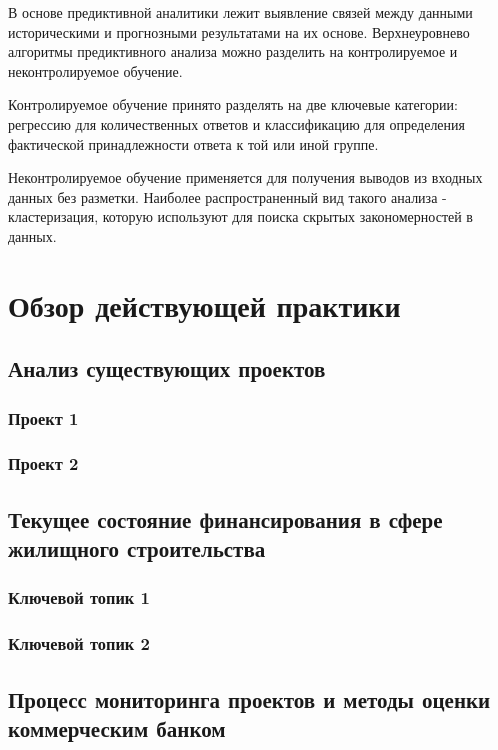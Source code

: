 \documentclass[12pt,a4paper]{article} %
\begin{document}
В основе предиктивной аналитики лежит выявление связей между данными историческими и прогнозными результатами на их основе. Верхнеуровнево алгоритмы предиктивного анализа можно разделить на контролируемое и неконтролируемое обучение.

Контролируемое обучение принято разделять на две ключевые категории: регрессию для количественных ответов и классификацию для определения фактической принадлежности ответа к той или иной группе. 
 
Неконтролируемое обучение применяется для получения выводов из входных данных без разметки. Наиболее распространенный вид такого анализа - кластеризация, которую используют для поиска скрытых закономерностей в данных.


\newpage
\section{Обзор действующей практики}
\subsection{Анализ существующих проектов}

\subsubsection{Проект 1}


\subsubsection{Проект 2}

\subsection{Текущее состояние финансирования в сфере жилищного строительства}

\subsubsection{Ключевой топик 1}


\subsubsection{Ключевой топик 2}

\subsection{Процесс мониторинга проектов и методы оценки коммерческим банком}
\end{document}
